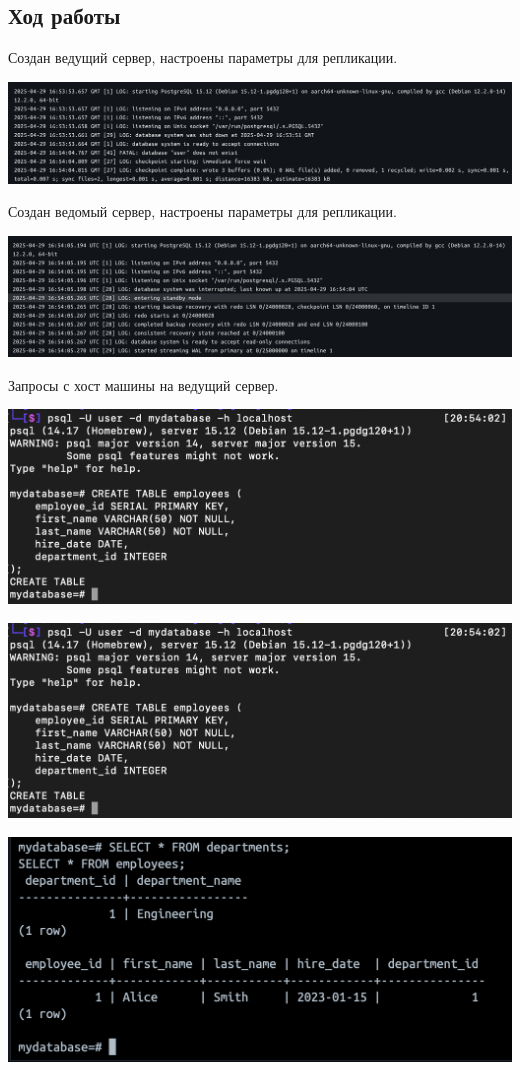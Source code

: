 \documentclass{article}
\begin{document}
\subsection*{Ход работы}
Создан ведущий сервер, настроены параметры для репликации.
\begin{center}
    \includegraphics[width=.9\textwidth]{primary.png}
\end{center}
Создан ведомый сервер, настроены параметры для репликации.
\begin{center}
    \includegraphics[width=.9\textwidth]{replica.png}
\end{center}
Запросы с хост машины на ведущий сервер.
\begin{center}
    \includegraphics[width=.9\textwidth]{createprimary.png}
\end{center}
\begin{center}
    \includegraphics[width=.9\textwidth]{createprimary.png}
\end{center}
\begin{center}
    \includegraphics[width=.9\textwidth]{ins-user1.png}
\end{center}
\end{document}
